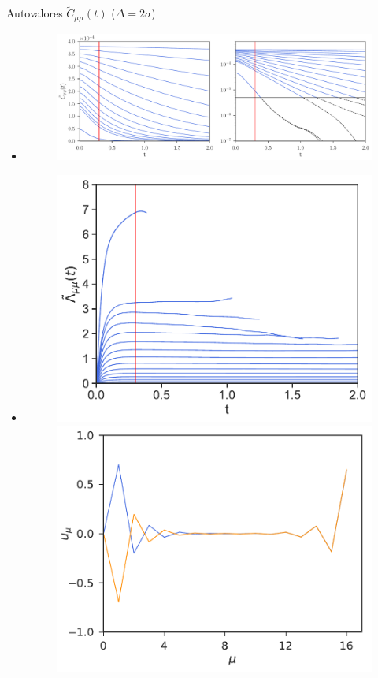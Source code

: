 \documentclass{beamer}
\begin{document}
\begin{frame}{Autovalores $\tilde{C}_{\mu\mu}(t)$ ($\Delta=2\sigma$)}
  \begin{itemize}
    \item<1->[]
\begin{figure}[h!]
  \includegraphics[width=0.97\linewidth]{CtRec-WALLS-17nodes-exp}
\end{figure}
    \item<2->[]
\begin{figure}[h!]
\includegraphics[scale=0.315]{LambdatRec-WALLS-17nodes}
\includegraphics[scale=0.315]{Eigenvectors-WALLS-17nodes}
\end{figure}
  \end{itemize}
\end{frame}
\end{document}
